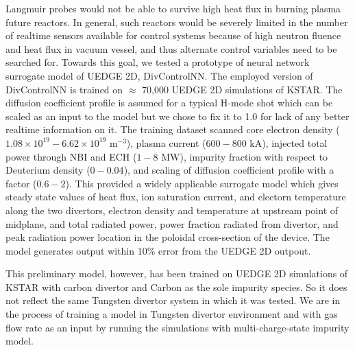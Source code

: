 Langmuir probes would not be able to survive high heat flux in burning plasma future reactors. In general, such reactors would be severely limited in the number of realtime sensors available for control systems because of high neutron fluence and heat flux in vacuum vessel, and thus alternate control variables need to be searched for. Towards this goal, we tested a prototype of neural network surrogate model of UEDGE 2D, DivControlNN. The employed version of DivControlNN is trained on $\approx$ 70,000 UEDGE 2D simulations of KSTAR. The diffusion coefficient profile is assumed for a typical H-mode shot which can be scaled as an input to the model but we chose to fix it to 1.0 for lack of any better realtime information on it. The training dataset scanned core electron density ($1.08 \times 10^{19} - 6.62 \times 10^{19}$ m$^{-3}$), plasma current ($600-800$ kA), injected total power through NBI and ECH ($1-8$ MW), impurity fraction with respect to Deuterium density ($0-0.04$), and scaling of diffusion coefficient profile with a factor ($0.6 - 2$). This provided a widely applicable surrogate model which gives steady state values of heat flux, ion saturation current, and electorn temperature along the two divertors, electron density and temperature at upstream point of midplane, and total radiated power, power fraction radiated from divertor, and peak radiation power location in the poloidal cross-section of the device. The model generates output within 10\% error from the UEDGE 2D outpout.

This preliminary model, however, has been trained on UEDGE 2D simulations of KSTAR with carbon divertor and Carbon as the sole impurity species. So it does not reflect the same Tungsten divertor system in which it was tested. We are in the process of training a model in Tungsten divertor environment and with gas flow rate as an input by running the simulations with multi-charge-state impurity model.
